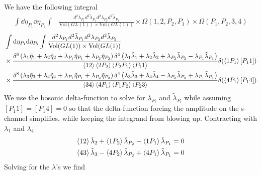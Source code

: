 \documentclass[a4paper,12pt]{article}
\begin{document}
We have the following integral
\begin{equation}
	\begin{aligned}
		\int \dd \eta_{P_1} \dd \eta_{P_2}\int&\frac{d^2\lambda_{P_1}d^2\tilde\lambda_{P_1}d^2\lambda_{P_2}d^2\tilde\lambda_{P_2}}{\text{Vol}(GL(1))\times\text{Vol}(GL(1))}\times \Omega (1,2,P_2,P_1)\times \Omega (P_1,P_2,3,4)
	\end{aligned}
\end{equation}
\begin{equation}
	\begin{aligned}
		&\int \dd \eta_{P_1} \dd \eta_{P_2}\int\frac{d^2\lambda_{P_1}d^2\tilde\lambda_{P_1}d^2\lambda_{P_2}d^2\tilde\lambda_{P_2}}{\text{Vol}(GL(1))\times\text{Vol}(GL(1))}\\&\times 	\frac{\delta^{8}\left(\lambda_{1}\tilde \eta_{1}+\lambda_{2}\tilde \eta_{2}+\lambda_{P_1}\tilde \eta_{P_1}+\lambda_{P_2}\tilde \eta_{P_2}\right)\delta^{4}\left(\lambda_{1}\tilde\lambda_{1}+\lambda_{2}\tilde\lambda_{2}+\lambda_{P_2}\tilde\lambda_{P_2}-\lambda_{P_1}\tilde\lambda_{P_1}\right)}{\expval{12}\expval{2P_2}\expval{P_2P_1}\expval{P_11}}\delta(\expval{1P_1}[P_1 1])
		\\&\times 	\frac{\delta^{8}\left(\lambda_{3}\tilde \eta_{3}+\lambda_{4}\tilde \eta_{4}+\lambda_{P_1}\tilde \eta_{P_1}+\lambda_{P_2}\tilde \eta_{P_2}\right)\delta^{4}\left(\lambda_{3}\tilde\lambda_{3}+\lambda_{4}\tilde\lambda_{4}-\lambda_{P_2}\tilde\lambda_{P_2}+\lambda_{P_1}\tilde\lambda_{P_1}\right)}{\expval{34}\expval{4P_1}\expval{P_1P_
			2}\expval{P_23}}\delta(\expval{4P_1}[P_1 4])
	\end{aligned}
\end{equation}
We use the bosonic delta-function to solve for $\lambda_{P_i}$ and $\tilde\lambda_{P_i}$ while assuming $[P_1 1]=[P_1 4]=0$ so that the delta-function forcing the amplitude on the s-channel simplifies, while keeping the integrand from blowing up. Contracting with $\lambda_1$ and $\lambda_4$
\begin{equation}
	\begin{aligned}
		\expval{12}\tilde\lambda_{2}+\expval{1P_2}\tilde\lambda_{P_2}-\expval{1P_1}\tilde\lambda_{P_1}=0\\
		\expval{43}\tilde\lambda_{3}-\expval{4P_2}\tilde\lambda_{P_2}+\expval{4P_1}\tilde\lambda_{P_1}=0
	\end{aligned}
\end{equation}
Solving for the $\lambda$'s we find
\end{document}
